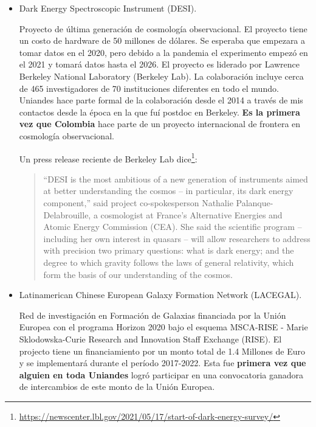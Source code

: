 \documentclass{article}
\begin{document}
\begin{itemize}

\item Dark Energy Spectroscopic Instrument (DESI).

Proyecto de \'ultima generaci\'on de cosmolog\'ia observacional.
El proyecto tiene un costo de hardware de 50 millones de d\'olares. Se esperaba que empezara a tomar datos en el 2020, pero debido a la pandemia el experimento empez\'o en el 2021 y tomar\'a datos hasta el 2026.
El proyecto es liderado por Lawrence Berkeley National Laboratory
(Berkeley Lab). 
La colaboraci\'on incluye cerca de 465 investigadores de 70
instituciones diferentes en todo el mundo.
Uniandes hace parte formal de la colaboraci\'on desde el 2014 a
trav\'es de mis contactos desde la \'epoca en la que fu\'i postdoc en
Berkeley. 
{\bf Es la primera vez que Colombia} hace parte de un proyecto internacional
de frontera en cosmolog\'ia observacional.


Un press release reciente de Berkeley Lab
dice\footnote{\url{https://newscenter.lbl.gov/2021/05/17/start-of-dark-energy-survey/}}: 
\begin{quote}
“DESI is the most ambitious of a new generation of instruments aimed at better understanding the cosmos – in particular, its dark energy component,” said project co-spokesperson Nathalie Palanque-Delabrouille, a cosmologist at France’s Alternative Energies and Atomic Energy Commission (CEA). She said the scientific program –  including her own interest in quasars –  will allow researchers to address with precision two primary questions: what is dark energy; and the degree to which gravity follows the laws of general relativity, which form the basis of our understanding of the cosmos.
\end{quote}


\item Latinamerican Chinese European Galaxy Formation Network
  (LACEGAL). 

Red de investigaci\'on en Formaci\'on de Galaxias financiada por la
Uni\'on Europea con el programa Horizon 2020 bajo el esquema MSCA-RISE - Marie
Sklodowska-Curie Research and Innovation Staff Exchange (RISE). El
projecto tiene un financiamiento por un monto total de 1.4 Millones de
Euro y se implementar\'a durante el per\'iodo 2017-2022.
Esta fue {\bf primera vez que alguien en toda Uniandes} logr\'o
participar en una convocatoria ganadora de intercambios de este monto
de la Uni\'on Europea.


\end{itemize}
\end{document}
